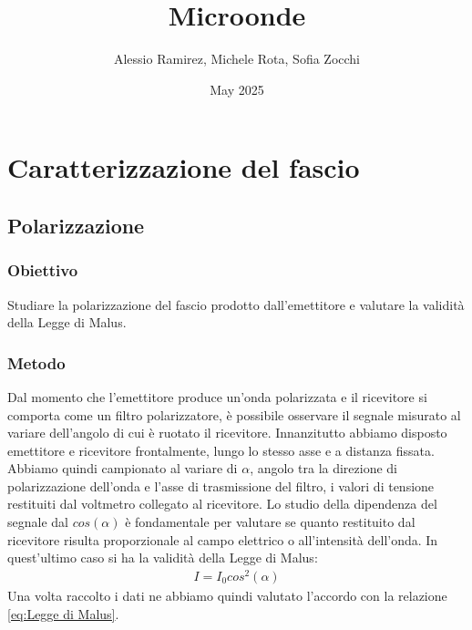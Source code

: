 \documentclass[a4paper]{article}
\title{Microonde}
\author{Alessio Ramirez, Michele Rota, Sofia Zocchi}
\date{May 2025}
\begin{document}
\maketitle
\section{Caratterizzazione del fascio}
\subsection{Polarizzazione}
\subsubsection{Obiettivo}
Studiare la polarizzazione del fascio prodotto dall'emettitore e valutare la validità della Legge di Malus.

\subsubsection{Metodo}
Dal momento che l'emettitore produce un'onda polarizzata e il ricevitore si comporta come un filtro polarizzatore, è possibile osservare il segnale misurato al variare dell'angolo di cui è ruotato il ricevitore. Innanzitutto abbiamo disposto emettitore e ricevitore frontalmente, lungo lo stesso asse e a distanza fissata. Abbiamo quindi campionato al variare di $\alpha$, angolo tra la direzione di polarizzazione dell'onda e l'asse di trasmissione del filtro, i valori di tensione restituiti dal voltmetro collegato al ricevitore. Lo studio della dipendenza del segnale dal $cos(\alpha)$ è fondamentale per valutare se quanto restituito dal ricevitore risulta proporzionale al campo elettrico o all'intensità dell'onda. In quest'ultimo caso si ha la validità della Legge di Malus:
\begin{align}
I = I_0 cos^2(\alpha)
\label{eq:Legge di Malus}
\end{align}
Una volta raccolto i dati ne abbiamo quindi valutato l'accordo con la relazione \ref{eq:Legge di Malus}.
\end{document}

